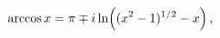 \[\mathop{\mathrm{arccos}\/}\nolimits x=\pi\mp i\mathop{\ln\/}\nolimits\!\left((%
x^{2}-1)^{1/2}-x\right),\]